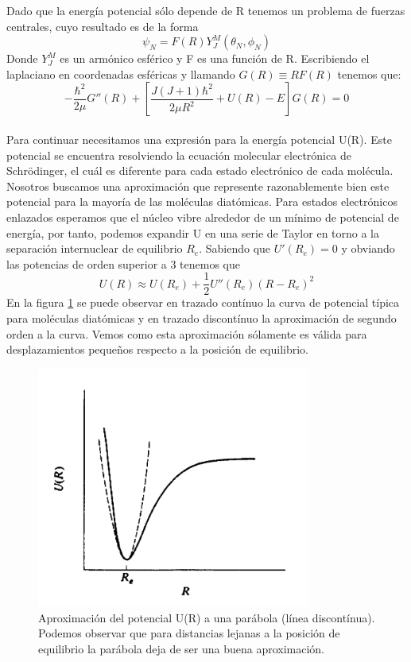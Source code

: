 \documentclass[a4paper]{article}
\begin{document}
Dado que la energía potencial sólo depende de R tenemos un problema de fuerzas centrales, cuyo resultado es de la forma
\begin{equation}
\psi_N=F(R)Y^M_J(\theta_N,\phi_N)
\end{equation}
Donde $Y^M_J$ es un armónico esférico y F es una función de R.
Escribiendo el laplaciano en coordenadas esféricas y llamando $G(R)\equiv RF(R)$ tenemos que:
\begin{equation}
-\frac{\hbar^2}{2\mu}G''(R)+\left[\frac{J(J+1)\hbar^2}{2\mu R^2}+U(R)-E\right]G(R)=0
\end{equation}\\

Para continuar necesitamos una expresión para la energía potencial U(R). Este potencial se encuentra resolviendo la ecuación molecular electrónica de Schrödinger, el cuál es diferente para cada estado electrónico de cada molécula. Nosotros buscamos una aproximación que represente razonablemente bien este potencial para la mayoría de las moléculas diatómicas. Para estados electrónicos enlazados esperamos que el núcleo vibre alrededor de un mínimo de potencial de energía, por tanto, podemos expandir U en una serie de Taylor en torno a la separación internuclear de equilibrio $R_e$. Sabiendo que $U'(R_e)=0$ y obviando las potencias de orden superior a 3 tenemos que
\begin{equation}\label{aproximacion1}
U(R) \approx U(R_e)+\frac{1}{2}U''(R_e)(R-R_e)^2
\end{equation}
En la figura \ref{potencial} se puede observar en trazado contínuo la curva de potencial típica para moléculas diatómicas y en trazado discontínuo la aproximación de segundo orden a la curva. Vemos como esta aproximación sólamente es válida para desplazamientos pequeños respecto a la posición de equilibrio.
\begin{figure}
\includegraphics[width=0.8\textwidth]{curva_potencial.png}
\caption{Aproximación del potencial U(R) a una parábola (línea discontínua). Podemos observar que para distancias lejanas a la posición de equilibrio la parábola deja de ser una buena aproximación.}
\label{potencial}
\end{figure}
\end{document}
